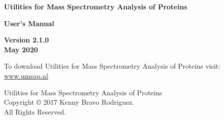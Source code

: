 \clearpage
\thispagestyle{empty}
\begin{center}
{\Huge\textbf{Utilities for Mass Spectrometry Analysis of Proteins}}

\vspace{60pt}

{\huge \textbf{User's Manual}}

\vspace{70pt}

{\Large \textbf{Version \num[parse-numbers=false]{2.1.0} \\ \vspace{10pt} May \num[detect-weight]{2020}}}

\vspace{140pt}

To download Utilities for Mass Spectrometry Analysis of Proteins visit: \\
\href{https://www.umsap.nl}{www.umsap.nl}

\vspace*{\fill}
Utilities for Mass Spectrometry Analysis of Proteins \\Copyright © \num[detect-weight]{2017} Kenny Bravo Rodriguez. \\All Rights Reserved.

\end{center}

\newpage
\thispagestyle{empty}
 \label{sec:tableofcontent}
\tableofcontents

\newpage
\thispagestyle{empty}
 \label{sec:listoffig}
\listoffigures

\newpage
\thispagestyle{empty}
 \label{sec:listoftables}
\listoftables